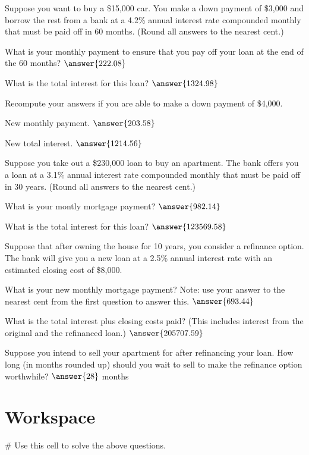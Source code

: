 \documentclass{ximera}
\begin{document}
\begin{question}
Suppose you want to buy a \$15,000 car. You make a down payment of \$3,000 and borrow the rest from a bank at a 4.2\% annual interest rate compounded monthly that must be paid off in 60 months. (Round all answers to the nearest cent.)
	
What is your monthly payment to ensure that you pay off your loan at the end of the 60 months? $\answer{222.08}$

What is the total interest for this loan? $\answer{1324.98}$

Recompute your answers if you are able to make a down payment of \$4,000.

New monthly payment. $\answer{203.58}$

New total interest. $\answer{1214.56}$
\end{question}

\begin{question}
	Suppose you take out a \$230,000 loan to buy an apartment. The bank offers you a loan at a 3.1\% annual interest rate compounded monthly that must be paid off in 30 years. (Round all answers to the nearest cent.)

What is your montly mortgage payment? $\answer{982.14}$

What is the total interest for this loan? $\answer{123569.58}$

Suppose that after owning the house for 10 years, you consider a refinance option. The bank will give you a new loan at a 2.5\% annual interest rate with an estimated closing cost of \$8,000.

What is your new monthly mortgage payment? Note: use your answer to the nearest cent from the first question to answer this. $\answer{693.44}$

What is the total interest plus closing costs paid? (This includes interest from the original and the refinanced loan.) $\answer{205707.59}$

Suppose you intend to sell your apartment for after refinancing your loan. How long (in months rounded up) should you wait to sell to make the refinance option worthwhile? $\answer{28}$ months
\end{question}

\section{Workspace}

\begin{sageCell}
# Use this cell to solve the above questions.
\end{sageCell}
\end{document}
